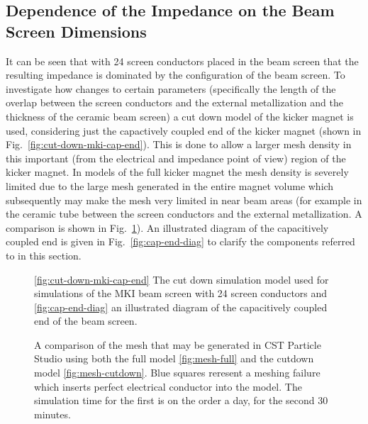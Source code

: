 \subsection{Dependence of the Impedance on the Beam Screen Dimensions}

It can be seen that with 24 screen conductors placed in the beam screen that the resulting impedance is dominated by the configuration of the beam screen. To investigate how changes to certain parameters (specifically the length of the overlap between the screen conductors and the external metallization and the thickness of the ceramic beam screen) a cut down model of the kicker magnet is used, considering just the capactively coupled end of the kicker magnet (shown in Fig.~\ref{fig:cut-down-mki-cap-end}). This is done to allow a larger mesh density in this important (from the electrical and impedance point of view) region of the kicker magnet. In models of the full kicker magnet the mesh density is severely limited due to the large mesh generated in the entire magnet volume which subsequently may make the mesh very limited in near beam areas (for example in the ceramic tube between the screen conductors and the external metallization. A comparison is shown in Fig.~\ref{fig:mki-mesh-com-cst}). An illustrated diagram of the capacitively coupled end is given in Fig.~\ref{fig:cap-end-diag} to clarify the components referred to in this section.

\begin{figure}
\subfigure[]{
\label{fig:cut-down-mki-cap-end}
}
\subfigure[]{
\label{fig:cap-end-diag}
}
\caption{\ref{fig:cut-down-mki-cap-end} The cut down simulation model used for simulations of the MKI beam screen with 24 screen conductors and \ref{fig:cap-end-diag} an illustrated diagram of the capacitively coupled end of the beam screen.}
\end{figure}

\begin{figure}
\subfigure[]{
\label{fig:mesh-full}
}
\subfigure[]{
\label{fig:mesh-cutdown}
}
\label{fig:mki-mesh-com-cst}
\caption{A comparison of the mesh that may be generated in CST Particle Studio using both the full model \ref{fig:mesh-full} and the cutdown model \ref{fig:mesh-cutdown}. Blue squares reresent a meshing failure which inserts perfect electrical conductor into the model. The simulation time for the first is on the order a day, for the second 30 minutes.}
\end{figure}


